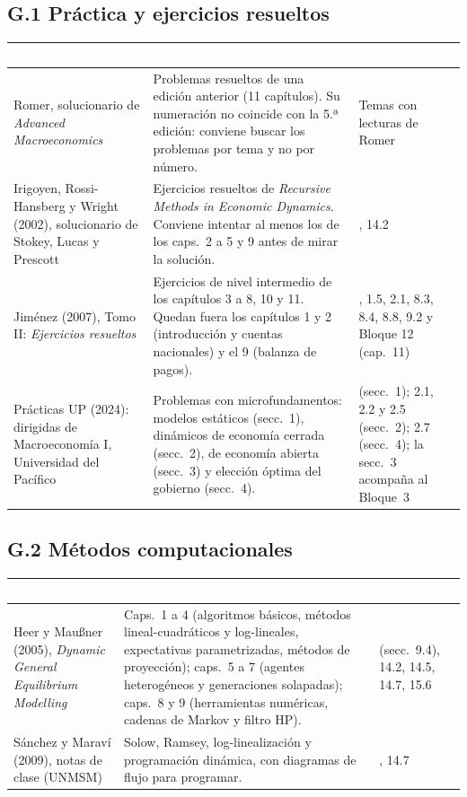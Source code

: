 \documentclass[11pt,a4paper]{article}
\newcommand{\cab}[1]{\textcolor{white}{\sffamily\bfseries #1}}
\newcommand{\filasalternas}{\rowcolors{2}{white}{tonoPalido}}
\begin{document}
\subsection*{G.1 Práctica y ejercicios resueltos}
{\small\filasalternas
\noindent\begin{tabularx}{\textwidth}{>{\raggedright\arraybackslash}p{4.1cm}>{\raggedright\arraybackslash}X>{\raggedright\arraybackslash}p{3.2cm}}
\toprule
\rowcolor{tonoOscuro}\cab{Recurso} & \cab{Uso sugerido} & \cab{Temas} \\
\midrule
Romer, solucionario de \emph{Advanced Macroeconomics} & Problemas resueltos de una edición anterior (11 capítulos). Su numeración no coincide con la 5.ª edición: conviene buscar los problemas por tema y no por número. & Temas con lecturas de Romer \\[2pt]
Irigoyen, Rossi-Hansberg y Wright (2002), solucionario de Stokey, Lucas y Prescott & Ejercicios resueltos de \emph{Recursive Methods in Economic Dynamics}. Conviene intentar al menos los de los caps.~2 a 5 y 9 antes de mirar la solución. & 14.1, 14.2 \\[2pt]
Jiménez (2007), Tomo II: \emph{Ejercicios resueltos} & Ejercicios de nivel intermedio de los capítulos 3 a 8, 10 y 11. Quedan fuera los capítulos 1 y 2 (introducción y cuentas nacionales) y el 9 (balanza de pagos). & 1.1, 1.5, 2.1, 8.3, 8.4, 8.8, 9.2 y Bloque 12 (cap.~11) \\[2pt]
Prácticas UP (2024): dirigidas de Macroeconomía I, Universidad del Pacífico & Problemas con microfundamentos: modelos estáticos (secc.~1), dinámicos de economía cerrada (secc.~2), de economía abierta (secc.~3) y elección óptima del gobierno (secc.~4). & 14.3 (secc.~1); 2.1, 2.2 y 2.5 (secc.~2); 2.7 (secc.~4); la secc.~3 acompaña al Bloque~3 \\
\bottomrule
\end{tabularx}
}

\subsection*{G.2 Métodos computacionales}
{\small\filasalternas
\noindent\begin{tabularx}{\textwidth}{>{\raggedright\arraybackslash}p{4.1cm}>{\raggedright\arraybackslash}X>{\raggedright\arraybackslash}p{3.2cm}}
\toprule
\rowcolor{tonoOscuro}\cab{Recurso} & \cab{Uso sugerido} & \cab{Temas} \\
\midrule
Heer y Maußner (2005), \emph{Dynamic General Equilibrium Modelling} & Caps.~1 a 4 (algoritmos básicos, métodos lineal-cuadráticos y log-lineales, expectativas parametrizadas, métodos de proyección); caps.~5 a 7 (agentes heterogéneos y generaciones solapadas); caps.~8 y 9 (herramientas numéricas, cadenas de Markov y filtro HP). & 12.1 (secc.~9.4), 14.2, 14.5, 14.7, 15.6 \\[2pt]
Sánchez y Maraví (2009), notas de clase (UNMSM) & Solow, Ramsey, log-linealización y programación dinámica, con diagramas de flujo para programar. & 14.5, 14.7 \\
\bottomrule
\end{tabularx}
}
\end{document}
